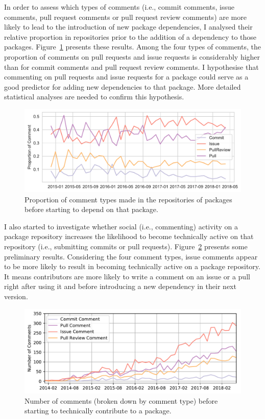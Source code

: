 In order to assess which types of comments (i.e., commit comments, issue comments, pull request comments or pull request review comments) are more likely to lead to the introduction of new package dependencies, I analysed their relative proportion in repositories prior to the addition of a dependency to those packages. Figure~\ref{fig:fig2} presents these results. 
Among the four types of comments, the proportion of comments on pull requests and issue requests is considerably higher than for commit comments and pull request review comments. I hypothesise that commenting on pull requests and issue requests for a package could serve as a good predictor for adding new dependencies to that package. More detailed statistical analyses are needed to confirm this hypothesis.

\begin{figure}[htb]
    \includegraphics[width=0.95\columnwidth]{Photos/RQ22.pdf} 
    \caption{Proportion of comment types made in the repositories of packages before starting to depend on that package.}
    \label{fig:fig2}
\end{figure}

I also started to investigate whether social (i.e., commenting) activity on a package repository increases the likelihood to become technically active on that repository (i.e., submitting commits or pull requests). 
Figure~\ref{fig:fig3} presents some preliminary results. Considering the four comment types, issue comments appear to be more likely to result in becoming technically active on a package repository.
It means contributors are more likely to write a comment on an issue or a pull right after using it and before introducing a new dependency in their next version. 
\begin{figure}[thb]
    \includegraphics[width=0.95\columnwidth]{Photos/RQ3.pdf} 
    \caption{Number of comments (broken down by comment type) before starting  to technically contribute to a package.}
    \label{fig:fig3}
\end{figure}


